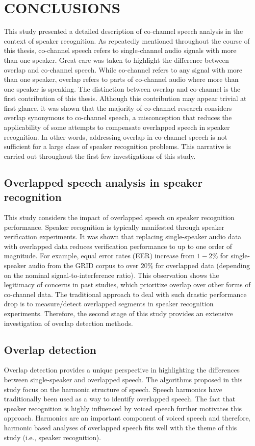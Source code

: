 \chapter{CONCLUSIONS}

This study presented a detailed description of co-channel speech analysis in the context of speaker recognition. 
As repeatedly mentioned throughout the course of this thesis, co-channel speech refers to single-channel audio signals with more than one speaker. 
Great care was taken to highlight the difference between overlap and co-channel speech. 
While co-channel refers to any signal with more than one speaker, overlap refers to parts of co-channel audio where more than one speaker is speaking. 
The distinction between overlap and co-channel is the first contribution of this thesis. 
Although this contribution may appear trivial at first glance, it was shown that the majority of co-channel research considers overlap synonymous to co-channel speech, a misconception that reduces the applicability of some attempts to compensate overlapped speech in speaker recognition. 
In other words, addressing overlap in co-channel speech is not sufficient for a large class of speaker recognition problems. 
This narrative is carried out throughout the first few investigations of this study. 

\section{Overlapped speech analysis in speaker recognition}
This study considers the impact of overlapped speech on speaker recognition performance. 
Speaker recognition is typically manifested through speaker verification experiments. 
It was shown that replacing single-speaker audio data with overlapped data reduces verification performance to up to one order of magnitude. 
For example, equal error rates (EER) increase from $1 - 2\%$ for single-speaker audio from the GRID corpus to over $20\%$ for overlapped data (depending on the nominal signal-to-interference ratio). 
This observation shows the legitimacy of concerns in past studies, which prioritize overlap over other forms of co-channel data. 
The traditional approach to deal with such drastic performance drop is to measure/detect overlapped segments in speaker recognition experiments. 
Therefore, the second stage of this study provides an extensive investigation of overlap detection methods. 

\section{Overlap detection}
Overlap detection provides a unique perspective in highlighting the differences between single-speaker and overlapped speech. 
The algorithms proposed in this study focus on the harmonic structure of speech. 
Speech harmonics have traditionally been used as a way to identify overlapped speech. 
The fact that speaker recognition is highly influenced by voiced speech further motivates this approach. 
Harmonics are an important component of voiced speech and therefore, harmonic based analyses of overlapped speech fits well with the theme of this study (i.e., speaker recognition). 


